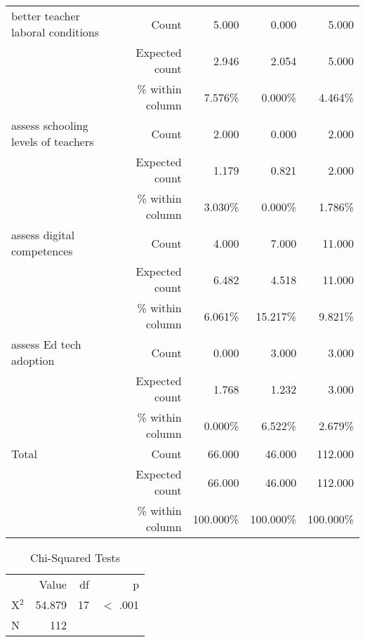 \documentclass[6pt, oneside]{article}   	%
\begin{document}
\begin{table}[h]
{\begin{tabular}{lrrrr}
			better teacher laboral conditions & Count & 5.000 & 0.000 & 5.000  \\
			 & Expected count & 2.946 & 2.054 & 5.000  \\
			 &  \% within column & 7.576\% & 0.000\% & 4.464\%  \\
			assess schooling levels of teachers & Count & 2.000 & 0.000 & 2.000  \\
			 & Expected count & 1.179 & 0.821 & 2.000  \\
			 &  \% within column & 3.030\% & 0.000\% & 1.786\%  \\
			assess digital competences & Count & 4.000 & 7.000 & 11.000  \\
			 & Expected count & 6.482 & 4.518 & 11.000  \\
			 &  \% within column & 6.061\% & 15.217\% & 9.821\%  \\
			assess Ed tech adoption & Count & 0.000 & 3.000 & 3.000  \\
			 & Expected count & 1.768 & 1.232 & 3.000  \\
			 &  \% within column & 0.000\% & 6.522\% & 2.679\%  \\
			Total & Count & 66.000 & 46.000 & 112.000  \\
			 & Expected count & 66.000 & 46.000 & 112.000  \\
			 &  \% within column & 100.000\% & 100.000\% & 100.000\%  \\
			\bottomrule
		\end{tabular}
	}
\end{table}



\begin{table}[h]
	\centering
	\caption{Chi-Squared Tests}
	\label{tab:chi-SquaredTests}
	{
		\begin{tabular}{lrrr}
			\toprule
			 & Value & df & p  \\
			\cmidrule[0.4pt]{1-4}
			X$^{2}$ & 54.879 & 17 & $<$ .001  \\
			N & 112 &  &    \\
			\bottomrule
		\end{tabular}
	}
\end{table}
\end{document}
